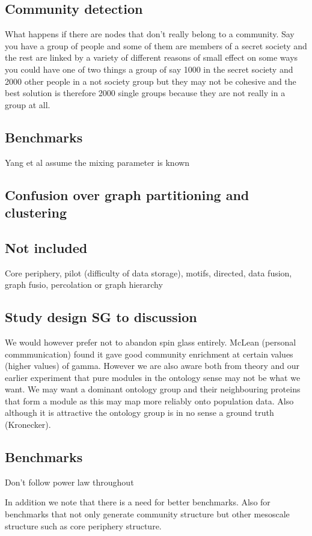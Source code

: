  
 \subsection{Community detection}
 What happens if there are nodes that don't really belong to a community. Say you have a group of people and some of them are members of a secret society and the rest are linked by a variety of different reasons of small effect on some ways you could have one of two things a group of say 1000 in the secret society and 2000 other people in a not society group but they may not be cohesive and the best solution is therefore 2000 single groups because they are not really in a group at all. 
 
 
 \subsection{Benchmarks}
 
 Yang et al \cite{yang2016comparative} assume the mixing parameter is known 
 
 
 \subsection{Confusion over graph partitioning and clustering}
 
 \subsection{Not included}
 Core periphery, pilot (difficulty of data storage), motifs, directed, data fusion, graph fusio, percolation or graph hierarchy
 
 
 \subsection{Study design SG to discussion}
We would however prefer not to abandon spin glass entirely. McLean (personal commmunication) found it gave good community enrichment at certain values (higher values) of gamma. However we are also aware both from theory and our earlier experiment that pure modules in the ontology sense may not be what we want. We may want a dominant ontology group and their neighbouring proteins that form a module as this may map more reliably onto population data. Also although it is attractive the ontology group is in no sense a ground truth  (Kronecker).



\subsection{Benchmarks}
Don't follow power law throughout


In addition we note that there is a need for better benchmarks. Also for benchmarks that not only generate community structure but other mesoscale structure such as core periphery structure. 


